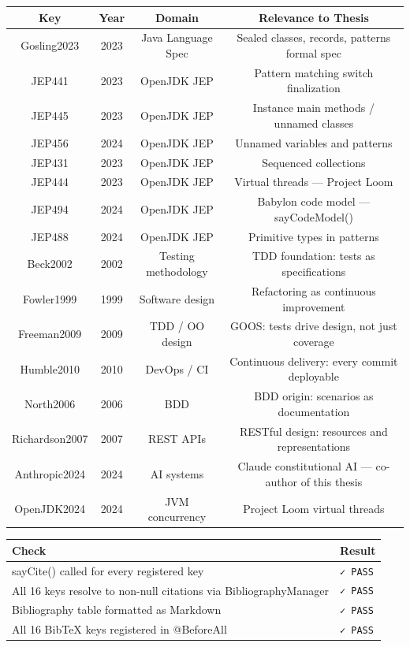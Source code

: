 \documentclass[11pt]{article}
\begin{document}
\begin{table}[h]
\centering
\begin{tabular}{|c|c|c|c|}
\hline
\textbf{Key} & \textbf{Year} & \textbf{Domain} & \textbf{Relevance to Thesis} \\
\hline
Gosling2023 & 2023 & Java Language Spec & Sealed classes, records, patterns formal spec \\
JEP441 & 2023 & OpenJDK JEP & Pattern matching switch finalization \\
JEP445 & 2023 & OpenJDK JEP & Instance main methods / unnamed classes \\
JEP456 & 2024 & OpenJDK JEP & Unnamed variables and patterns \\
JEP431 & 2023 & OpenJDK JEP & Sequenced collections \\
JEP444 & 2023 & OpenJDK JEP & Virtual threads — Project Loom \\
JEP494 & 2024 & OpenJDK JEP & Babylon code model — sayCodeModel() \\
JEP488 & 2024 & OpenJDK JEP & Primitive types in patterns \\
Beck2002 & 2002 & Testing methodology & TDD foundation: tests as specifications \\
Fowler1999 & 1999 & Software design & Refactoring as continuous improvement \\
Freeman2009 & 2009 & TDD / OO design & GOOS: tests drive design, not just coverage \\
Humble2010 & 2010 & DevOps / CI & Continuous delivery: every commit deployable \\
North2006 & 2006 & BDD & BDD origin: scenarios as documentation \\
Richardson2007 & 2007 & REST APIs & RESTful design: resources and representations \\
Anthropic2024 & 2024 & AI systems & Claude constitutional AI — co-author of this thesis \\
OpenJDK2024 & 2024 & JVM concurrency & Project Loom virtual threads \\
\hline
\end{tabular}
\end{table}


\begin{table}[h]
\centering
\begin{tabular}{|l|l|}
\hline
\textbf{Check} & \textbf{Result} \\
\hline
sayCite() called for every registered key & \texttt{✓ PASS} \\
All 16 keys resolve to non-null citations via BibliographyManager & \texttt{✓ PASS} \\
Bibliography table formatted as Markdown & \texttt{✓ PASS} \\
All 16 BibTeX keys registered in @BeforeAll & \texttt{✓ PASS} \\
\hline
\end{tabular}
\end{table}
\end{document}
